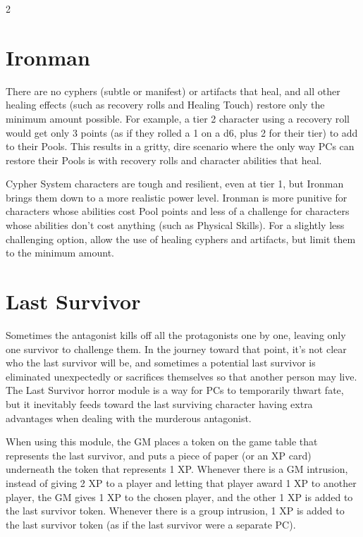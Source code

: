 \begin{multicols}{2}
\section{Ironman}

There are no cyphers (subtle or manifest) or artifacts that heal, and all other healing effects (such as recovery rolls and Healing Touch) restore only the minimum amount possible. For example, a tier 2 character using a recovery roll would get only 3 points (as if they rolled a 1 on a d6, plus 2 for their tier) to add to their Pools. This results in a gritty, dire scenario where the only way PCs can restore their Pools is with recovery rolls and character abilities that heal.

Cypher System characters are tough and resilient, even at tier 1, but Ironman brings them down to a more realistic power level. Ironman is more punitive for characters whose abilities cost Pool points and less of a challenge for characters whose abilities don’t cost anything (such as Physical Skills). For a slightly less challenging option, allow the use of healing cyphers and artifacts, but limit them to the minimum amount.

\section{Last Survivor}

Sometimes the antagonist kills off all the protagonists one by one, leaving only one survivor to challenge them. In the journey toward that point, it’s not clear who the last survivor will be, and sometimes a potential last survivor is eliminated unexpectedly or sacrifices themselves so that another person may live. The Last Survivor horror module is a way for PCs to temporarily thwart fate, but it inevitably feeds toward the last surviving character having extra advantages when dealing with the murderous antagonist.

When using this module, the GM places a token on the game table that represents the last survivor, and puts a piece of paper (or an XP card) underneath the token that represents 1 XP. Whenever there is a GM intrusion, instead of giving 2 XP to a player and letting that player award 1 XP to another player, the GM gives 1 XP to the chosen player, and the other 1 XP is added to the last survivor token. Whenever there is a group intrusion, 1 XP is added to the last survivor token (as if the last survivor were a separate PC).


\end{multicols}
